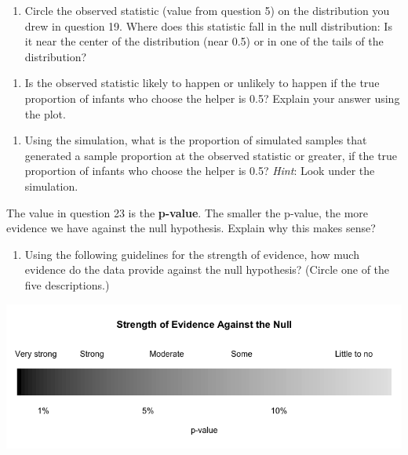\documentclass[
]{report}
\providecommand{\tightlist}{%
  \setlength{\itemsep}{0pt}\setlength{\parskip}{0pt}}
\begin{document}
\vspace{1in}

\begin{enumerate}
\def\labelenumi{\arabic{enumi}.}
\setcounter{enumi}{20}
\tightlist
\item
  Circle the observed statistic (value from question 5) on the distribution you drew in question 19. Where does this statistic fall in the null distribution: Is it near the center of the distribution (near 0.5) or in one of the tails of the distribution?
\end{enumerate}

\vspace{1in}

\begin{enumerate}
\def\labelenumi{\arabic{enumi}.}
\setcounter{enumi}{21}
\tightlist
\item
  Is the observed statistic likely to happen or unlikely to happen if the true proportion of infants who choose the helper is 0.5? Explain your answer using the plot.
\end{enumerate}

\vspace{1in}

\begin{enumerate}
\def\labelenumi{\arabic{enumi}.}
\setcounter{enumi}{22}
\tightlist
\item
  Using the simulation, what is the proportion of simulated samples that generated a sample proportion at the observed statistic or greater, if the true proportion of infants who choose the helper is 0.5? \emph{Hint}: Look under the simulation.
\end{enumerate}

\vspace{1in}

The value in question 23 is the \textbf{p-value}. The smaller the p-value, the more evidence we have against the null hypothesis. Explain why this makes sense?

\vspace{0.5in}

\begin{enumerate}
\def\labelenumi{\arabic{enumi}.}
\setcounter{enumi}{23}
\tightlist
\item
  Using the following guidelines for the strength of evidence, how much evidence do the data provide against the null hypothesis? (Circle one of the five descriptions.)
\end{enumerate}

\begin{center}\includegraphics[width=0.9\linewidth]{images/soe_gradient_grayscale} \end{center}
\end{document}
